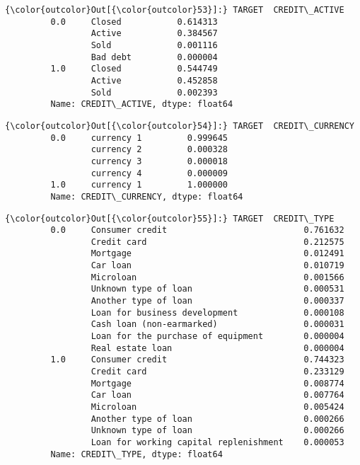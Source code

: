 \documentclass[11pt]{article}
\begin{document}
           
\begin{Verbatim}[commandchars=\\\{\}]
{\color{outcolor}Out[{\color{outcolor}53}]:} TARGET  CREDIT\_ACTIVE
         0.0     Closed           0.614313
                 Active           0.384567
                 Sold             0.001116
                 Bad debt         0.000004
         1.0     Closed           0.544749
                 Active           0.452858
                 Sold             0.002393
         Name: CREDIT\_ACTIVE, dtype: float64
\end{Verbatim}
            


\begin{Verbatim}[commandchars=\\\{\}]
{\color{outcolor}Out[{\color{outcolor}54}]:} TARGET  CREDIT\_CURRENCY
         0.0     currency 1         0.999645
                 currency 2         0.000328
                 currency 3         0.000018
                 currency 4         0.000009
         1.0     currency 1         1.000000
         Name: CREDIT\_CURRENCY, dtype: float64
\end{Verbatim}
            
\begin{Verbatim}[commandchars=\\\{\}]
{\color{outcolor}Out[{\color{outcolor}55}]:} TARGET  CREDIT\_TYPE                           
         0.0     Consumer credit                           0.761632
                 Credit card                               0.212575
                 Mortgage                                  0.012491
                 Car loan                                  0.010719
                 Microloan                                 0.001566
                 Unknown type of loan                      0.000531
                 Another type of loan                      0.000337
                 Loan for business development             0.000108
                 Cash loan (non-earmarked)                 0.000031
                 Loan for the purchase of equipment        0.000004
                 Real estate loan                          0.000004
         1.0     Consumer credit                           0.744323
                 Credit card                               0.233129
                 Mortgage                                  0.008774
                 Car loan                                  0.007764
                 Microloan                                 0.005424
                 Another type of loan                      0.000266
                 Unknown type of loan                      0.000266
                 Loan for working capital replenishment    0.000053
         Name: CREDIT\_TYPE, dtype: float64
\end{Verbatim}
            
\end{document}
